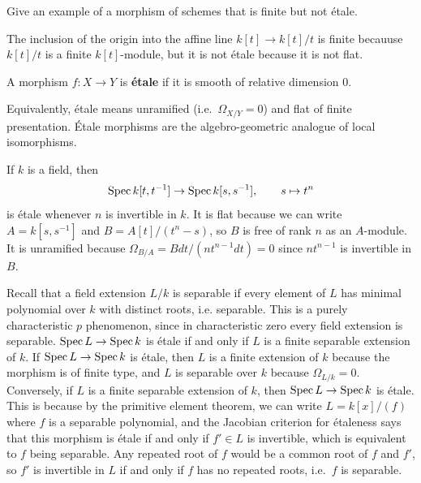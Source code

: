 \documentclass[12pt]{article}
\begin{document}
\begin{exercise}
    Give an example of a morphism of schemes that is finite but not étale.
\end{exercise}

\begin{solution}
The inclusion of the origin into the affine line $k[t]\to k[t]/t$ is finite becauuse $k[t]/t$ is a finite $k[t]$-module, but it is not étale because it is not flat.
\end{solution}

\begin{definition}
    A morphism $f:X\to Y$ is \textbf{étale} if it is smooth of relative dimension $0$.
\end{definition}

Equivalently, étale means unramified (i.e.\ $\Omega_{X/Y}=0$)
and flat of finite presentation. Étale morphisms are the algebro-geometric analogue of local isomorphisms.

\begin{example}
    If $k$ is a field, then
    \[
        \operatorname{Spec} k[t,t^{-1}] \to \operatorname{Spec} k[s,s^{-1}],
        \qquad s\mapsto t^n
    \]
    is étale whenever $n$ is invertible in $k$. It is flat because we can write $A = k[s,s^{-1}]$ and $B = A[t]/(t^n - s)$, so $B$ is free of rank $n$ as an $A$-module. It is unramified because $\Omega_{B/A}= B dt / (nt^{n-1} dt) = 0$ since $nt^{n-1}$ is invertible in $B$.
\end{example}

\begin{example} Recall that a field extension $L/k$ is separable if every element of $L$ has minimal polynomial over $k$ with distinct roots, i.e. separable. This is a purely characteristic $p$ phenomenon, since in characteristic zero every field extension is separable.
    $\operatorname{Spec} L \to \operatorname{Spec} k$ is étale if and only if $L$ is a finite separable extension of $k$. If $\operatorname{Spec} L \to \operatorname{Spec} k$ is étale, then $L$ is a finite extension of $k$ because the morphism is of finite type, and $L$ is separable over $k$ because $\Omega_{L/k}=0$. Conversely, if $L$ is a finite separable extension of $k$, then $\operatorname{Spec} L \to \operatorname{Spec} k$ is étale. This is because by the primitive element theorem, we can write $L = k[x]/(f)$ where $f$ is a separable polynomial, and the Jacobian criterion for étaleness says that this morphism is étale if and only if $f' \in L$ is invertible, which is equivalent to $f$ being separable. Any repeated root of $f$ would be a common root of $f$ and $f'$, so $f'$ is invertible in $L$ if and only if $f$ has no repeated roots, i.e.\ $f$ is separable.
\end{example}
\end{document}
